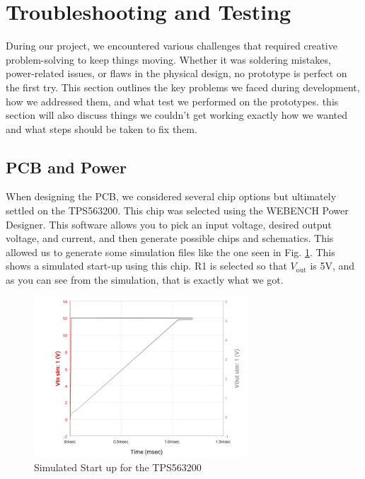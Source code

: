 \section{Troubleshooting and Testing}
During our project, we encountered various challenges that required creative problem-solving to keep things moving. Whether it was soldering mistakes, power-related issues, or flaws in the physical design, no prototype is perfect on the first try. This section outlines the key problems we faced during development, how we addressed them, and what test we performed on the prototypes. this section will also discuss things we couldn't get working exactly how we wanted and what steps should be taken to fix them.
\subsection{PCB and Power}
When designing the PCB, we considered several chip options but ultimately settled on the TPS563200. This chip was selected using the WEBENCH Power Designer. This software allows you to pick an input voltage, desired output voltage, and current, and then generate possible chips and schematics. This allowed us to generate some simulation files like the one seen in Fig. \ref{fig:Vout}. This shows a simulated start-up using this chip. R1 is selected so that \(V_{\text{out}}\) is 5V, and as you can see from the simulation, that is exactly what we got.
\begin{figure}[H]
    \centering
    \includegraphics[height=6cm]{Vout_chart.png}
     \caption{Simulated Start up for the TPS563200}
    \label{fig:Vout}
\end{figure}
